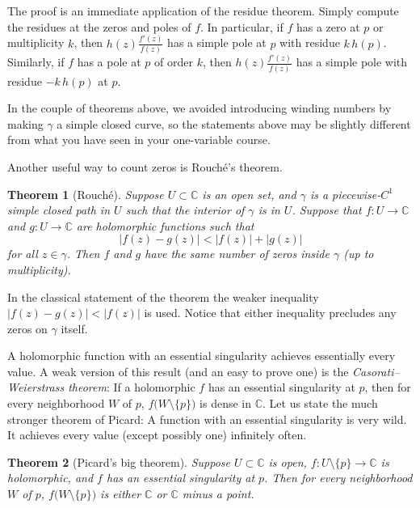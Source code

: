 \documentclass[12pt,openany]{book}
\newcommand{\sabs}[1]{\lvert {#1} \rvert}
\newcommand{\C}{{\mathbb{C}}}
\newcommand{\myindex}[1]{#1\index{#1}}
\theoremstyle{plain}
\newtheorem{thm}{Theorem}[section]
\theoremstyle{remark}
\theoremstyle{definition}
\theoremstyle{exercise}
\theoremstyle{example}
\begin{document}
The proof is an immediate application of the residue theorem.  Simply
compute the residues at the zeros and poles of $f$.  In particular,
if $f$ has a zero at $p$ or multiplicity $k$, then $h(z) \frac{f'(z)}{f(z)}$
has a simple pole
at $p$ with residue $k\, h(p)$.  Similarly, if $f$ has a pole at $p$ of
order $k$,
then $h(z) \frac{f'(z)}{f(z)}$ has a simple pole with residue $-k\, h(p)$ at $p$.

In the couple of theorems above,
we avoided introducing winding numbers by making $\gamma$ a simple closed curve,
so the statements above may be slightly different from what you have seen in
your one-variable course.

Another useful way to count zeros is Rouch\'e's theorem.

\begin{thm}[Rouch\'e]\label{thm:onevarrouche}
Suppose $U \subset \C$ is an open set, and $\gamma$ is a piecewise-$C^1$
simple closed path in $U$ such that the interior of $\gamma$ is in $U$.
Suppose that $f \colon U \to \C$ and $g \colon U \to \C$
are holomorphic functions such that
\begin{equation*}
\sabs{f(z)-g(z)} < \sabs{f(z)}+\sabs{g(z)}
\end{equation*}
for all $z \in \gamma$.  Then $f$ and $g$
have the same number of zeros
inside $\gamma$ (up to multiplicity).
\end{thm}

In the classical statement of the theorem the weaker
inequality $\sabs{f(z)-g(z)} < \sabs{f(z)}$ is used.
Notice that either inequality precludes any zeros on $\gamma$ itself.

A holomorphic function with an essential singularity achieves essentially
every value.  A weak version of this result (and an easy to prove one)
is the \emph{\myindex{Casorati--Weierstrass theorem}}:
If a holomorphic $f$ has an essential singularity at $p$,
then for every neighborhood $W$ of $p$, $f\bigl(W \setminus \{p\}\bigr)$ is dense in
$\C$.  Let us state the much stronger theorem of Picard:
A function with an essential singularity is very wild.
It achieves every value (except possibly one) infinitely often.

\begin{thm}[Picard's big theorem]
Suppose $U \subset \C$ is open, $f \colon U \setminus \{ p \} \to \C$
is holomorphic, and $f$ has an essential singularity at $p$.  Then for every
neighborhood $W$ of $p$, $f\bigl(W \setminus \{ p \}\bigr)$ is either $\C$
or $\C$ minus a point.
\end{thm}
\end{document}
